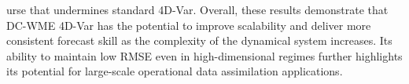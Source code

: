 \documentclass[final,1p,times]{elsarticle}
\begin{document}
urse that undermines standard 4D-Var. 
Overall, these results demonstrate that DC-WME 4D-Var has the potential to improve scalability and deliver more consistent forecast skill as the complexity of the dynamical system increases. 
Its ability to maintain low RMSE even in high-dimensional regimes further highlights its potential for large-scale operational data assimilation applications.





\end{document}
